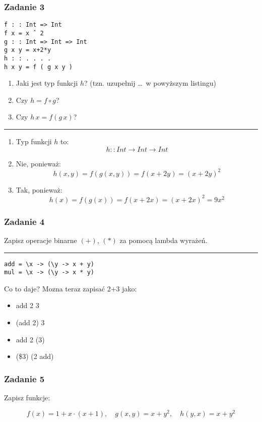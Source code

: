 \documentclass[11pt,a4paper]{article}
\begin{document}
\subsubsection{Zadanie 3}
\begin{Verbatim}[frame=single]
f : : Int => Int
f x = x ˆ 2
g : : Int => Int => Int
g x y = x+2*y
h : : . . . .
h x y = f ( g x y )
\end{Verbatim}
\begin{enumerate}
    \item Jaki jest typ funkcji \( h \)? (tzn. uzupełnij \dots\ w powyższym listingu)
    \item Czy \( h = f \circ g \)?
    \item Czy \( h \, x = f(g \, x) \)?
\end{enumerate}
\bigskip
\hrule
\bigskip
\begin{enumerate}
    \item Typ funkcji \( h \) to:
        \[
            h::Int \rightarrow Int \rightarrow Int
        \]
    \item Nie, ponieważ:
        \[
            h(x,y) = f(g(x,y)) = f(x+2y) = (x+2y)^2
        \]
    \item Tak, ponieważ:
        \[
            h(x) = f(g(x)) = f(x+2x) = (x+2x)^2 = 9x^2
        \]
\end{enumerate}

\subsubsection{Zadanie 4}
Zapisz operacje binarne \( (+) \), \( (\ast) \) za pomocą lambda wyrażeń.
\bigskip
\hrule
\bigskip
\begin{Verbatim}[frame=single]
add = \x -> (\y -> x + y)
mul = \x -> (\y -> x * y)
\end{Verbatim}
Co to daje?
Mozna teraz zapisać 2+3 jako:
\begin{itemize}
    \item add 2 3
    \item (add 2) 3
    \item add 2 (3)
    \item (\$3) (2 add)
\end{itemize}

\subsubsection{Zadanie 5}
Zapisz funkcje:

\[
f(x) = 1 + x \cdot (x + 1), \quad g(x, y) = x + y^2, \quad h(y, x) = x + y^2
\]
\end{document}
